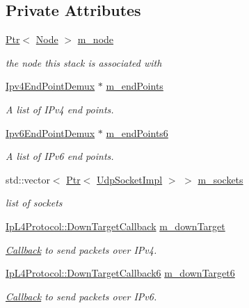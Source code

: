 \subsection*{Private Attributes}
\begin{DoxyCompactItemize}
\item 
\hyperlink{classns3_1_1Ptr}{Ptr}$<$ \hyperlink{classns3_1_1Node}{Node} $>$ \hyperlink{classns3_1_1UdpL4Protocol_a3b659100db66be53351016f3875ba62a}{m\+\_\+node}
\begin{DoxyCompactList}\small\item\em the node this stack is associated with \end{DoxyCompactList}\item 
\hyperlink{classns3_1_1Ipv4EndPointDemux}{Ipv4\+End\+Point\+Demux} $\ast$ \hyperlink{classns3_1_1UdpL4Protocol_a3bde93d3afb318d7e0b4a7b3d3a58e7c}{m\+\_\+end\+Points}
\begin{DoxyCompactList}\small\item\em A list of I\+Pv4 end points. \end{DoxyCompactList}\item 
\hyperlink{classns3_1_1Ipv6EndPointDemux}{Ipv6\+End\+Point\+Demux} $\ast$ \hyperlink{classns3_1_1UdpL4Protocol_a30ee62ced3762babc55527297cbff077}{m\+\_\+end\+Points6}
\begin{DoxyCompactList}\small\item\em A list of I\+Pv6 end points. \end{DoxyCompactList}\item 
std\+::vector$<$ \hyperlink{classns3_1_1Ptr}{Ptr}$<$ \hyperlink{classns3_1_1UdpSocketImpl}{Udp\+Socket\+Impl} $>$ $>$ \hyperlink{classns3_1_1UdpL4Protocol_aaa39062111e636c000289b1305460094}{m\+\_\+sockets}
\begin{DoxyCompactList}\small\item\em list of sockets \end{DoxyCompactList}\item 
\hyperlink{classns3_1_1IpL4Protocol_ae3ba76c0a48fbaa90529c528a15f12b6}{Ip\+L4\+Protocol\+::\+Down\+Target\+Callback} \hyperlink{classns3_1_1UdpL4Protocol_a82401fff4ce9b7f04ef1aa5cfeebd010}{m\+\_\+down\+Target}
\begin{DoxyCompactList}\small\item\em \hyperlink{classns3_1_1Callback}{Callback} to send packets over I\+Pv4. \end{DoxyCompactList}\item 
\hyperlink{classns3_1_1IpL4Protocol_a039f3d1883632ab922fa958fc9ecd97f}{Ip\+L4\+Protocol\+::\+Down\+Target\+Callback6} \hyperlink{classns3_1_1UdpL4Protocol_a82cec3d00eafff718533aa5191624e05}{m\+\_\+down\+Target6}
\begin{DoxyCompactList}\small\item\em \hyperlink{classns3_1_1Callback}{Callback} to send packets over I\+Pv6. \end{DoxyCompactList}\end{DoxyCompactItemize}
